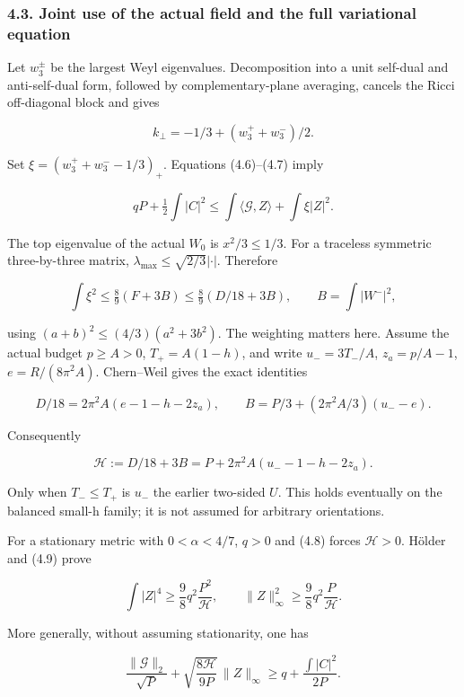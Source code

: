 \documentclass[
  10pt,
]{article}
\begin{document}
\hypertarget{joint-use-of-the-actual-field-and-the-full-variational-equation}{%
\subsubsection{4.3. Joint use of the actual field and the full
variational
equation}\label{joint-use-of-the-actual-field-and-the-full-variational-equation}}

Let \(w_3^\pm\) be the largest Weyl eigenvalues. Decomposition into a
unit self-dual and anti-self-dual form, followed by complementary-plane
averaging, cancels the Ricci off-diagonal block and gives

\[
 k_\perp=-1/3+(w_3^++w_3^-)/2.
\]

Set \(\xi=(w_3^++w_3^--1/3)_+\). Equations (4.6)--(4.7) imply

\[
 qP+\tfrac12\int|C|^2
             \le\int\langle\mathcal G,Z\rangle+\int\xi|Z|^2.
                                                        \tag{4.8}
\]

The top eigenvalue of the actual \(W_0\) is \(x^2/3\le1/3\). For a
traceless symmetric three-by-three matrix,
\(\lambda_{\max}\le\sqrt{2/3}|\cdot|\). Therefore

\[
 \int\xi^2\le\tfrac89(F+3B)
            \le\tfrac89(D/18+3B),\qquad B=\int|W^-|^2,          \tag{4.9}
\]

using \((a+b)^2\le(4/3)(a^2+3b^2)\). The weighting matters here. Assume
the actual budget \(p\ge A>0\), \(T_+=A(1-h)\), and write
\(u_-=3T_-/A\), \(z_a=p/A-1\), \(e=R/(8\pi^2A)\). Chern--Weil gives the
exact identities

\[
 D/18=2\pi^2A(e-1-h-2z_a),\qquad
 B=P/3+(2\pi^2A/3)(u_--e).
\]

Consequently

\[
 \boxed{\mathcal H:=D/18+3B
             =P+2\pi^2A(u_--1-h-2z_a).}             \tag{4.10}
\]

Only when \(T_-\le T_+\) is \(u_-\) the earlier two-sided \(U\). This
holds eventually on the balanced small-h family; it is not assumed for
arbitrary orientations.

For a stationary metric with \(0<\alpha<4/7\), \(q>0\) and (4.8) forces
\(\mathcal H>0\). Hölder and (4.9) prove

\[
 \boxed{\int|Z|^4\ge\frac98q^2\frac{P^2}{\mathcal H},
 \qquad \|Z\|_\infty^2\ge\frac98q^2\frac P{\mathcal H}.}       \tag{4.11}
\]

More generally, without assuming stationarity, one has

\[
 \boxed{
 \frac{\|\mathcal G\|_2}{\sqrt P}
       +\sqrt{\frac{8\mathcal H}{9P}}\,\|Z\|_\infty
               \ge q+\frac{\int|C|^2}{2P}.}         \tag{4.12}
\]
\end{document}
